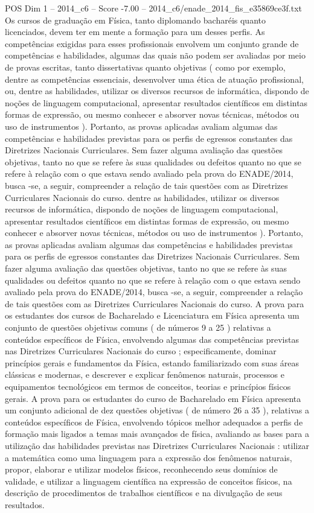 \begin{textsample}{POS Dim 1 – 2014\_c6 – Score -7.00 – 2014\_c6/enade\_2014\_fis\_e35869ce3f.txt}
Os cursos de graduação em Física, tanto diplomando bacharéis quanto licenciados, devem ter em mente a formação para um desses perfis.
As competências exigidas para esses profissionais envolvem um conjunto grande de competências e habilidades, algumas das quais não podem ser avaliadas por meio de provas escritas, tanto dissertativas quanto objetivas ( como por exemplo, dentre as competências essenciais, desenvolver uma ética de atuação profissional, ou, dentre as habilidades, utilizar os diversos recursos de informática, dispondo de noções de linguagem computacional, apresentar resultados científicos em distintas formas de expressão, ou mesmo conhecer e absorver novas técnicas, métodos ou uso de instrumentos ).
Portanto, as provas aplicadas avaliam algumas das competências e habilidades previstas para os perfis de egressos constantes das Diretrizes Nacionais Curriculares.
Sem fazer alguma avaliação das questões objetivas, tanto no que se refere às suas qualidades ou defeitos quanto no que se refere à relação com o que estava sendo avaliado pela prova do ENADE/2014, busca -se, a seguir, compreender a relação de tais questões com as Diretrizes Curriculares Nacionais do curso. dentre as habilidades, utilizar os diversos recursos de informática, dispondo de noções de linguagem computacional, apresentar resultados científicos em distintas formas de expressão, ou mesmo conhecer e absorver novas técnicas, métodos ou uso de instrumentos ).
Portanto, as provas aplicadas avaliam algumas das competências e habilidades previstas para os perfis de egressos constantes das Diretrizes Nacionais Curriculares.
Sem fazer alguma avaliação das questões objetivas, tanto no que se refere às suas qualidades ou defeitos quanto no que se refere à relação com o que estava sendo avaliado pela prova do ENADE/2014, busca -se, a seguir, compreender a relação de tais questões com as Diretrizes Curriculares Nacionais do curso.
A prova para os estudantes dos cursos de Bacharelado e Licenciatura em Física apresenta um conjunto de questões objetivas comuns ( de números 9 a 25 ) relativas a conteúdos específicos de Física, envolvendo algumas das competências previstas nas Diretrizes Curriculares Nacionais do curso ; especificamente, dominar princípios gerais e fundamentos da Física, estando familiarizado com suas áreas clássicas e modernas, e descrever e explicar fenômenos naturais, processos e equipamentos tecnológicos em termos de conceitos, teorias e princípios físicos gerais.
A prova para os estudantes do curso de Bacharelado em Física apresenta um conjunto adicional de dez questões objetivas ( de número 26 a 35 ), relativas a conteúdos específicos de Física, envolvendo tópicos melhor adequados a perfis de formação mais ligados a temas mais avançados de física, avaliando as bases para a utilização das habilidades previstas nas Diretrizes Curriculares Nacionais : utilizar a matemática como uma linguagem para a expressão dos fenômenos naturais, propor, elaborar e utilizar modelos físicos, reconhecendo seus domínios de validade, e utilizar a linguagem científica na expressão de conceitos físicos, na descrição de procedimentos de trabalhos científicos e na divulgação de seus resultados.

\end{textsample}
